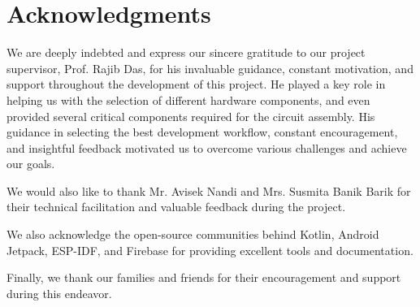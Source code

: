 \documentclass[12pt,a4paper,oneside]{report}
\begin{document}
\chapter*{Acknowledgments}

We are deeply indebted and express our sincere gratitude to our project supervisor, Prof. Rajib Das, for his invaluable guidance, constant motivation, and support throughout the development of this project. He played a key role in helping us with the selection of different hardware components, and even provided several critical components required for the circuit assembly. His guidance in selecting the best development workflow, constant encouragement, and insightful feedback motivated us to overcome various challenges and achieve our goals.

We would also like to thank Mr. Avisek Nandi and Mrs. Susmita Banik Barik for their technical facilitation and valuable feedback during the project.

We also acknowledge the open-source communities behind Kotlin, Android Jetpack, ESP-IDF, and Firebase for providing excellent tools and documentation.

Finally, we thank our families and friends for their encouragement and support during this endeavor.

\newpage

\tableofcontents
\pagebreak

\listoffigures
\pagebreak

\listoftables
\pagebreak











\end{document}
